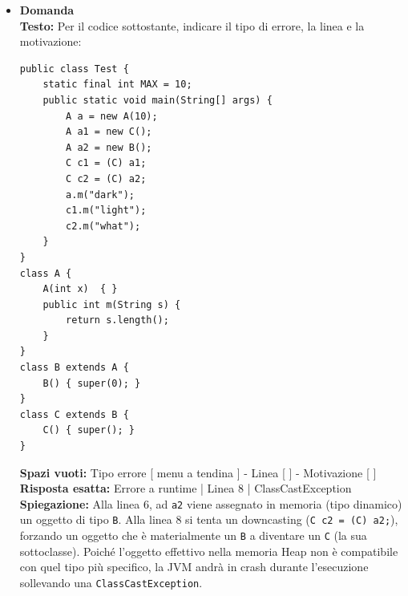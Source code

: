 \documentclass[12pt, a4paper]{article}
\begin{document}
\begin{itemize}
    \item {}\textbf{Domanda \thedomanda} \\
    \textbf{Testo:} Per il codice sottostante, indicare il tipo di errore, la linea e la motivazione:
\begin{verbatim}
public class Test {
    static final int MAX = 10;
    public static void main(String[] args) {
        A a = new A(10);
        A a1 = new C();
        A a2 = new B();
        C c1 = (C) a1;
        C c2 = (C) a2;
        a.m("dark");
        c1.m("light");
        c2.m("what");
    }
}
class A {
    A(int x)  { }
    public int m(String s) {
        return s.length();
    }
}
class B extends A {
    B() { super(0); }
}
class C extends B {
    C() { super(); }
}
\end{verbatim}
    \textbf{Spazi vuoti:} Tipo errore [ menu a tendina ] - Linea [ \hspace{1cm} ] - Motivazione [ \hspace{1cm} ] \\
    \textbf{Risposta esatta:} Errore a runtime | Linea 8 | ClassCastException \\
    \textbf{Spiegazione:} Alla linea 6, ad \texttt{a2} viene assegnato in memoria (tipo dinamico) un oggetto di tipo \texttt{B}. Alla linea 8 si tenta un downcasting (\texttt{C c2 = (C) a2;}), forzando un oggetto che è materialmente un \texttt{B} a diventare un \texttt{C} (la sua sottoclasse). Poiché l'oggetto effettivo nella memoria Heap non è compatibile con quel tipo più specifico, la JVM andrà in crash durante l'esecuzione sollevando una \texttt{ClassCastException}.
    \vspace{0.5cm}

\newpage


\end{itemize}
\end{document}
